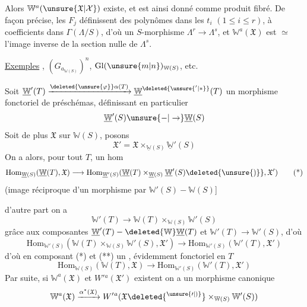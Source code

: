 Alors $\mathbb W^a(\unsure{\mathfrak X|\mathcal X})$ existe, et est ainsi donné comme produit fibré. De façon précise, les $F_j$  définissent des polynômes dans les $t_i$ $(1\leq i\leq r)$, à coefficients dans  $\Gamma(\Lambda/S)$, d'où  un $S$-morphisme $\Lambda^r\longrightarrow\Lambda^s$, et $\mathbb W^a(\mathfrak X)$ est $\simeq$ l'image inverse de la section nulle de $\Lambda^s$.

\uline{Exemples} , $(G_{a_{\underline{\mathbb W}(S)}})^n$, $\mathrm{Gl}(\unsure{m|n})_{\mathbb W(S)}$, etc.

Soit $\underline{\mathbb W}'(T)\xrightarrow{\deleted{\unsure{\varphi}}\alpha(T)}\underline{\mathbb W}^{\deleted{\unsure{'|*}}}(T)$ un morphisme fonctoriel de préschémas, définissant en particulier
\[
 \underline{\mathbb W}'(S)\unsure{-|\to}\underline{\mathbb W}(S)
\]
Soit de plus $\mathfrak X$ sur $\mathbb W(S)$, posons
\[
 \mathfrak X'=\mathfrak X\times_{\underline{\mathbb W}(S)}\underline{\mathbb W}'(S)
\]
On a alors, pour tout $T$, un hom 
\[
 \mathrm{Hom}_{\underline{\mathbb W}(S)}(\underline{\mathbb W}(T),\mathfrak X)\longrightarrow\mathrm{Hom}_{\underline{\mathbb W}'(S)}(\underline{\mathbb W}(T)\times_{\underline{\mathbb W}(S)}\underline{\mathbb W}'(S)\deleted{\unsure{)}},\mathfrak X')\tag*{(*)}
\]
(image réciproque d'un morphisme par $\mathbb W'(S)-\mathbb W(S)$]

d'autre part on a
\[
 \mathbb W'(T)\to\mathbb W(T)\times_{\mathbb W(S)}\mathbb W'(S)
\]
 grâce aux composantes $\underline{\mathbb W}'(T)-\deleted{\mathbb W}\underline{\mathbb W}(T)$ et $\mathbb W'(T)\to\mathbb W'(S)$, d'où
\[
 \mathrm{Hom}_{\mathbb W'(S)}(\mathbb W(T)\times_{\mathbb W(S)}\mathbb W'(S),\mathfrak X')\to\mathrm{Hom}_{\mathbb W'(S)}(\mathbb W'(T),\mathfrak X')\tag*{(**)}
\]
d'où en composant (*) et (**) un  , évidemment fonctoriel en $T$
\[
 \mathrm{Hom}_{\mathbb W(S)}(\mathbb W(T),\mathfrak X)\longrightarrow\mathrm{Hom}_{\mathbb W'(S)}(\mathbb W'(T),\mathfrak X')
\]
Par suite, si $\mathbb W^a(\mathfrak X)$ et $W'{}^a(\mathfrak X')$ existent on a un morphisme canonique
\[
 \mathbb W^a(\mathfrak X)\xrightarrow{\alpha^*(\mathfrak X)}W'{}^a(\mathfrak X\deleted{^{\unsure{\prime|)}}}\times_{\mathbb W(S)}\mathbb W'(S))
\]
